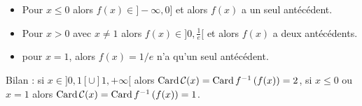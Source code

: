 {{\begin{enumerate}
   \begin{itemize}
      \item Pour $x\leqslant 0$ alors $f(x) \in ]-\infty,0]$ et alors $f(x)$ a un seul ant\'ec\'edent.

      \item Pour $x>0$ avec $x\neq 1$ alors $f(x) \in ]0,\frac 1e[$ et alors $f(x)$ a deux ant\'ec\'edents.
      
      \item pour $x=1$, alors $f(x) = 1/e$ n'a qu'un seul antécédent.
   \end{itemize}
   
   Bilan : si $x \in {}]0,1[ \cup ]1,+\infty[$ alors $\text{Card\,} \mathcal{C}(x) = \text{Card\,} f^{-1}\left( f(x) \right) = 2$,
   si $x\leqslant 0$ ou $x=1$ alors $\text{Card\,} \mathcal{C}(x) = \text{Card\,} f^{-1}\left( f(x) \right) = 1$.

 \end{enumerate}}
}